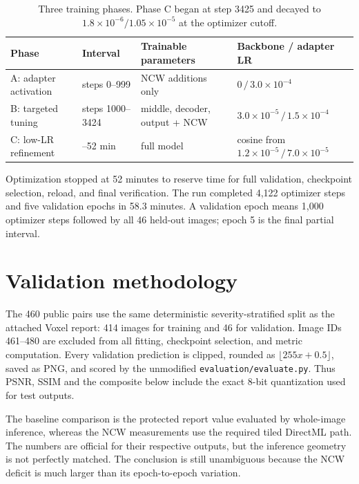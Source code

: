 \documentclass[12pt,a4paper]{article}
\begin{document}
\begin{table}[h]
\centering\small
\begin{tabularx}{\textwidth}{@{}>{\raggedright\arraybackslash}p{}>{\raggedright\arraybackslash}p{}>{\raggedright\arraybackslash}X>{\raggedright\arraybackslash}p{}@{}}
\toprule
Phase & Interval & Trainable parameters & Backbone / adapter LR \\
\midrule
A: adapter activation & steps 0--999 & NCW additions only & $0\,/\,3.0\times10^{-4}$ \\
B: targeted tuning & steps 1000--3424 & middle, decoder, output + NCW & $3.0\times10^{-5}\,/\,1.5\times10^{-4}$ \\
C: low-LR refinement & 40--52 min & full model & cosine from $1.2\times10^{-5}\,/\,7.0\times10^{-5}$ \\
\bottomrule
\end{tabularx}
\caption{Three training phases. Phase C began at step 3425 and decayed to $1.8\times10^{-6}/1.05\times10^{-5}$ at the optimizer cutoff.}
\end{table}

Optimization stopped at 52 minutes to reserve time for full validation, checkpoint selection, reload, and final verification. The run completed 4,122 optimizer steps and five validation epochs in 58.3 minutes. A validation epoch means 1,000 optimizer steps followed by all 46 held-out images; epoch 5 is the final partial interval.

\section{Validation methodology}
The 460 public pairs use the same deterministic severity-stratified split as the attached Voxel report: 414 images for training and 46 for validation. Image IDs 461--480 are excluded from all fitting, checkpoint selection, and metric computation. Every validation prediction is clipped, rounded as $\lfloor255x+0.5\rfloor$, saved as PNG, and scored by the unmodified \texttt{evaluation/evaluate.py}. Thus PSNR, SSIM and the composite below include the exact 8-bit quantization used for test outputs.

The baseline comparison is the protected report value evaluated by whole-image inference, whereas the NCW measurements use the required tiled DirectML path. The numbers are official for their respective outputs, but the inference geometry is not perfectly matched. The conclusion is still unambiguous because the NCW deficit is much larger than its epoch-to-epoch variation.
\end{document}
